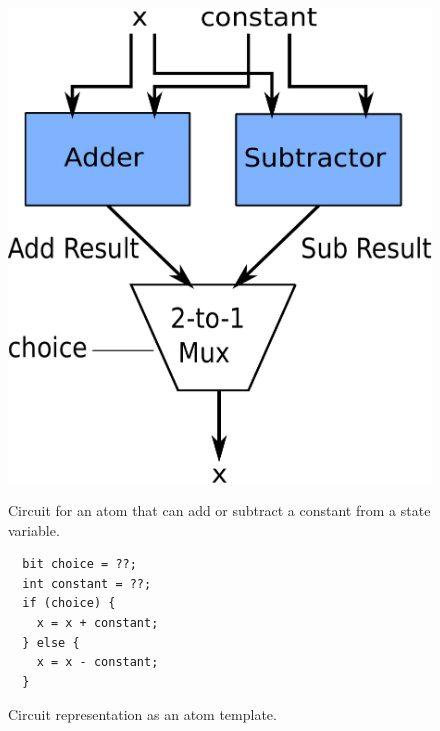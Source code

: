 \begin{figure}[h]
  \begin{minipage}{0.4\columnwidth}
  \begin{center}
  \includegraphics[width=\columnwidth]{circuit.pdf}
  \end{center}
  \caption{Circuit for an atom that can add or subtract a constant from a state variable.}
  \label{fig:alu_diag}
  \end{minipage}
  \hspace{0.05\columnwidth}
  \begin{minipage}{0.55\columnwidth}
  \begin{lstlisting}
  bit choice = ??;
  int constant = ??;
  if (choice) {
    x = x + constant;
  } else {
    x = x - constant;
  }
  \end{lstlisting}
  \caption{Circuit representation as an atom template.}
  \label{fig:alu_in_sketch}
  \end{minipage}
\end{figure}

